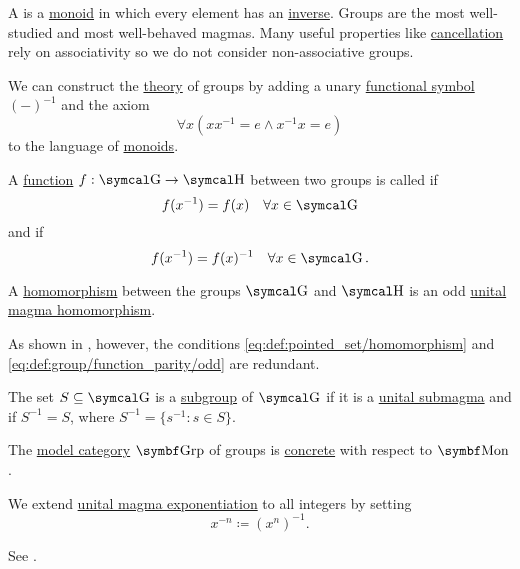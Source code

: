 \begin{definition}\label{def:group}
  A  is a \hyperref[def:unital_magma/associative]{monoid} in which every element has an \hyperref[def:unital_magma_inverse_element]{inverse}. Groups are the most well-studied and most well-behaved magmas. Many useful properties like \hyperref[thm:group_properties/cancellative]{cancellation} rely on associativity so we do not consider non-associative groups.

  \begin{DefEnum}
     We can construct the \hyperref[def:first_order_theory]{theory} of groups by adding a unary \hyperref[def:first_order_language/func]{functional symbol} \( (-)^{-1} \) and the axiom
    \begin{equation}\label{eq:def:group/theory/inverse_axiom}
      \forall x (xx^{-1} = e \wedge x^{-1}x = e)
    \end{equation}
    to the language of \hyperref[def:unital_magma/associative]{monoids}.

     A \hyperref[def:function/single_valued]{function} \( f: \CG \to \CH \) between two groups is called  if
    \begin{equation}\label{eq:def:group/function_parity/even}
      f(x^{-1}) = f(x) \quad\forall x \in \CG
    \end{equation}
    and  if
    \begin{equation}\label{eq:def:group/function_parity/odd}
      f(x^{-1}) = f(x)^{-1} \quad\forall x \in \CG.
    \end{equation}

     A \hyperref[def:first_order_homomorphism]{homomorphism} between the groups \( \CG \) and \( \CH \) is an odd \hyperref[def:unital_magma/homomorphism]{unital magma homomorphism}.

    As shown in , however, the conditions \eqref{eq:def:pointed_set/homomorphism} and \eqref{eq:def:group/function_parity/odd} are redundant.

     The set \( S \subseteq \CG \) is a \hyperref[def:first_order_substructure]{subgroup} of \( \CG \) if it is a \hyperref[def:unital_magma/substructure]{unital submagma} and if \( S^{-1} = S \), where \( S^{-1} = \{ s^{-1} \colon s \in S \} \).

     The \hyperref[def:first_order_model_category]{model category} \( \Cat{Grp} \) of groups is \hyperref[def:concrete_category]{concrete} with respect to \hyperref[def:unital_magma/associative]{\( \Cat{Mon} \)}.

     We extend \hyperref[def:unital_magma/exponentiation]{unital magma exponentiation} to all integers by setting
    \begin{equation*}
      x^{-n} \coloneqq (x^n)^{-1}.
    \end{equation*}

    See .
  \end{DefEnum}
\end{definition}

